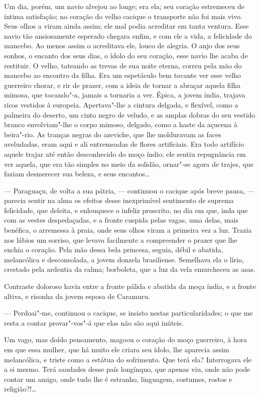 Um dia, porém, um navio alvejou ao longe; era ela; seu coração
estremeceu de íntima satisfação; no coração do velho cacique o
transporte não foi mais vivo. Seus olhos a viram ainda assim; ele mal
podia acreditar em tanta ventura. Esse navio tão ansiosamente esperado
chegara enfim, e com ele a vida, a felicidade do mancebo. Ao menos assim
o acreditava ele, louco de alegria. O anjo dos seus sonhos, o encanto
dos seus dias, o ídolo do seu coração, esse navio lhe acaba de
restituir. O velho, tateando as trevas de sua noite eterna, correu pela
mão do mancebo ao encontro da filha. Era um espetáculo bem tocante ver
esse velho guerreiro chorar, e rir de prazer, com a ideia de tornar a
abraçar aquela filha mimosa, que tocando"-a, jamais a tornaria a ver.
Épica, a jovem índia, trajava ricos vestidos à europeia. Apertava"-lhe a
cintura delgada, e flexível, como a palmeira do deserto, um cinto negro
de veludo, e as amplas dobras do seu vestido branco envolviam"-lhe o
corpo mimoso, delgado, como a haste da açucena à beira"-rio. As tranças
negras do azeviche, que lhe molduravam as faces aveludadas, eram aqui e
ali entremeadas de flores artificiais. Era todo artifício aquele trajar
até então desconhecido do moço índio; ele sentiu repugnância em ver
aquela, que era tão simples no meio da solidão, ornar"-se agora de
trajes, que faziam desmerecer sua beleza, e seus encantos\ldots{}

--- Paraguaçu, de volta a sua pátria, --- continuou o cacique após breve
pausa, --- parecia sentir na alma os efeitos desse inexprimível
sentimento de suprema felicidade, que deleita, e enlouquece o infeliz
proscrito, no dia em que, inda que com as vestes despedaçadas, e a
fronte cuspida pelas vagas, uma delas, mais benéfica, o arremessa à
praia, onde seus olhos viram a primeira vez a luz. Trazia nos lábios um
sorriso, que levava facilmente a compreender o prazer que lhe enchia o
coração. Pela mão dessa bela princesa, seguia, débil e abatida,
melancólica e desconsolada, a jovem donzela brasiliense. Semelhava ela o
lírio, crestado pela ardentia da calma; borboleta, que a luz da vela
emurcheceu as asas.

Contraste doloroso havia entre a fronte pálida e abatida da moça índia,
e a fronte altiva, e risonha da jovem esposa de Caramuru.

--- Perdoai"-me, continuou o cacique, se insisto nestas particularidades;
o que me resta a contar provar"-vos"-á que elas não são aqui inúteis.

Um vago, mas doído pensamento, magoou o coração do moço guerreiro, à
hora em que essa mulher, que há muito ele criara seu ídolo, lhe aparecia
assim melancólica, e triste como a estátua do sofrimento. Que terá ela?
Interrogava ele a si mesmo. Terá saudades desse país longínquo, que
apenas viu, onde não pode contar um amigo, onde tudo lhe é estranho,
linguagem, costumes, rostos e religião?!\ldots{}

